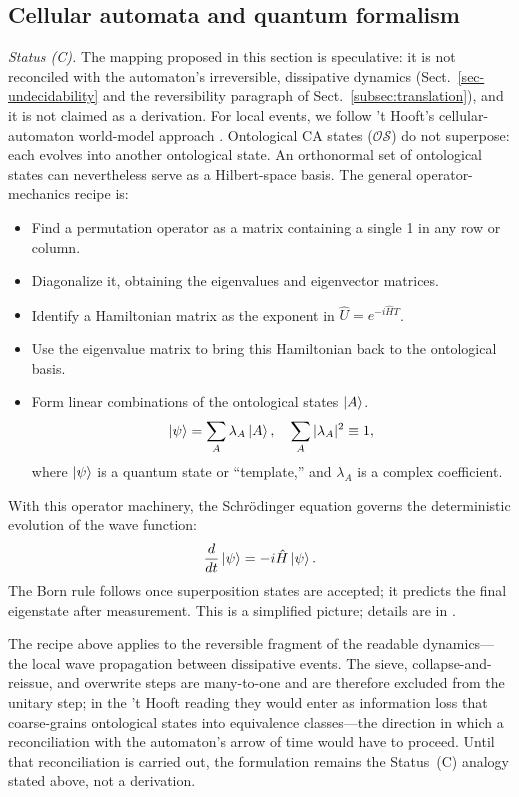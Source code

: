 \documentclass{ijuc}
\begin{document}
\subsection{Cellular automata and quantum formalism}\label{sec:bridge}
\emph{Status (C).} The mapping proposed in this section is speculative: it is not reconciled with the automaton's irreversible, dissipative dynamics (Sect.~\ref{sec-undecidability} and the reversibility paragraph of Sect.~\ref{subsec:translation}), and it is not claimed as a derivation.
For local events, we follow 't Hooft's cellular-automaton world-model approach \cite{thooft}. Ontological CA states ($\mathcal{OS}$) do not superpose: each evolves into another ontological state. An orthonormal set of ontological states can nevertheless serve as a Hilbert-space basis.
The general operator-mechanics recipe is:
\begin{itemize}
\item Find a permutation operator as a matrix containing a single 1 in any row or column.
\item Diagonalize it, obtaining the eigenvalues and eigenvector matrices.
\item Identify a Hamiltonian matrix as the exponent in $\hat{U}=e^{-i\hat{H}T}$.
\item Use the eigenvalue matrix to bring this Hamiltonian back to the ontological basis.
\item Form linear combinations of the ontological states $\ket{A}$.
\[
\ket{\psi} = \sum_A \lambda_A \ket{A}, \quad \sum_A |\lambda_A|^2 \equiv 1,
\]
where $\ket{\psi}$ is a quantum state or ``template,'' and $\lambda_A$ is a complex coefficient.
\end{itemize}
With this operator machinery, the Schr\"{o}dinger equation governs the deterministic evolution of the wave function:
\[
\frac{d}{dt}\ket{\psi} = -i\hat{H}\ket{\psi}.
\]
The Born rule follows once superposition states are accepted; it predicts the final eigenstate after measurement. This is a simplified picture; details are in \cite{thooft,Elze2019,rizzo2020perturbing}.

The recipe above applies to the reversible fragment of the readable dynamics---the local wave propagation between dissipative events.  The sieve, collapse-and-reissue, and overwrite steps are many-to-one and are therefore excluded from the unitary step; in the 't Hooft reading they would enter as information loss that coarse-grains ontological states into equivalence classes---the direction in which a reconciliation with the automaton's arrow of time would have to proceed.  Until that reconciliation is carried out, the formulation remains the Status~(C) analogy stated above, not a derivation.
\end{document}

